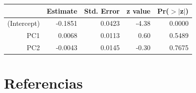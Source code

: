 \documentclass[a4paper,12pt]{Latex/Classes/PhDthesisPSnPDF}
\begin{document}
\begin{center}
\begin{table}[ht]
\centering
\begin{tabular}{rrrrr}
  \hline
 & Estimate & Std. Error & z value & Pr($>$$|$z$|$) \\ 
  \hline
(Intercept) & -0.1851 & 0.0423 & -4.38 & 0.0000 \\ 
  PC1 & 0.0068 & 0.0113 & 0.60 & 0.5489 \\ 
  PC2 & -0.0043 & 0.0145 & -0.30 & 0.7675 \\ 
   \hline
\end{tabular}
\end{table}\end{center}


\chapter*{Referencias}
\end{document}

